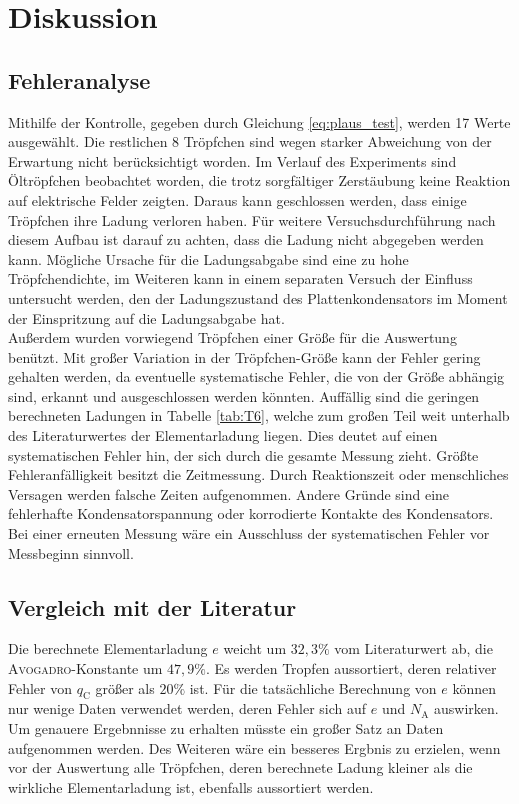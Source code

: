 \section{Diskussion}
\label{sec:Diskussion}

\subsection{Fehleranalyse}
Mithilfe der Kontrolle, gegeben durch Gleichung \eqref{eq:plaus_test}, werden 17 Werte ausgewählt.
Die restlichen 8 Tröpfchen sind wegen starker Abweichung von der Erwartung nicht berücksichtigt worden.
Im Verlauf des Experiments sind Öltröpfchen beobachtet worden, die trotz sorgfältiger Zerstäubung keine Reaktion auf elektrische Felder zeigten. 
Daraus kann geschlossen werden, dass einige Tröpfchen ihre Ladung verloren haben.
Für weitere Versuchsdurchführung nach diesem Aufbau ist darauf zu achten, dass die Ladung nicht abgegeben werden kann.
Mögliche Ursache für die Ladungsabgabe sind eine zu hohe Tröpfchendichte,
im Weiteren kann in einem separaten Versuch der Einfluss untersucht werden, 
den der Ladungszustand des Plattenkondensators im Moment der Einspritzung auf die Ladungsabgabe hat.\\
Außerdem wurden vorwiegend Tröpfchen einer Größe für die Auswertung benützt.
Mit großer Variation in der Tröpfchen-Größe kann der Fehler gering gehalten werden, da eventuelle systematische Fehler, die von der Größe abhängig sind, erkannt und ausgeschlossen werden könnten.
Auffällig sind die geringen berechneten Ladungen in Tabelle \ref{tab:T6}, welche zum großen Teil weit unterhalb des Literaturwertes der Elementarladung liegen. Dies deutet auf einen systematischen Fehler hin, der sich durch die gesamte Messung zieht. Größte Fehleranfälligkeit besitzt die Zeitmessung. Durch Reaktionszeit oder menschliches Versagen werden falsche Zeiten aufgenommen. Andere Gründe sind eine fehlerhafte Kondensatorspannung oder korrodierte Kontakte des Kondensators. Bei einer erneuten Messung wäre ein Ausschluss der systematischen Fehler vor Messbeginn sinnvoll.

\subsection{Vergleich mit der Literatur}
Die berechnete Elementarladung $e$ weicht um $32,3\%$ vom Literaturwert ab, die \textsc{Avogadro}-Konstante um $47,9\%$. 
Es werden Tropfen aussortiert, deren relativer Fehler von $q_\mathup{C}$ größer als $20\%$ ist. Für die tatsächliche Berechnung von $e$ können nur wenige Daten verwendet werden, deren Fehler sich auf $e$ und $N_\mathup{A}$ auswirken. Um genauere Ergebnnisse zu erhalten müsste ein großer Satz an Daten aufgenommen werden. Des Weiteren wäre ein besseres Ergbnis zu erzielen, wenn vor der Auswertung alle Tröpfchen, deren berechnete Ladung kleiner als die wirkliche Elementarladung ist, ebenfalls aussortiert werden.
